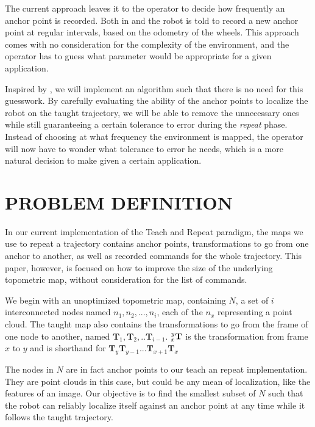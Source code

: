 \documentclass[letterpaper,10 pt,conference]{ieeeconf}
\newcommand{\mat}[1]{\mathbf{#1}}
\begin{document}
The current approach leaves it to the operator to decide how frequently an anchor point is
recorded. Both in \cite{Furgale10} and \cite{Sprunk13} the robot is told to record a new anchor
point at regular intervals, based on the odometry of the wheels. This approach comes with no
consideration for the complexity of the environment, and the operator has to guess what parameter
would be appropriate for a given application.

Inspired by \cite{Churchill15}, we will implement an algorithm such that there is no need for this
guesswork. By carefully evaluating the ability of the anchor points to localize the robot on the taught
trajectory, we will be able to remove the unnecessary ones while still guaranteeing a certain
tolerance to error during the \textit{repeat} phase. Instead of choosing at what frequency the
environment is mapped, the operator will now have to wonder what tolerance to error he needs, which
is a more natural decision to make given a certain application.


\section{PROBLEM DEFINITION}

In our current implementation of the Teach and Repeat paradigm, the maps we use to repeat a
trajectory contains anchor points, transformations to go from one anchor to another, as well as
recorded commands for the whole trajectory. This paper, however, is focused on how to improve the
size of the underlying topometric map, without consideration for the list of commands.

We begin with an unoptimized topometric map, containing $N$, a set of $i$
interconnected nodes named $n_1, n_2, ..., n_{i}$, each of the $n_x$ representing
a point cloud. The taught map also contains the transformations to go from the
frame of one node to another, named $\mat{T}_1, \mat{T}_2,..
\mat{T}_{i-1}$.
$\prescript{y}{x}{\mat{T}}$ is the transformation from frame $x$ to $y$ and is
shorthand for $\mat{T}_y \mat{T}_{y-1}...\mat{T}_{x+1} \mat{T}_x$ 

The nodes in $N$ are in fact anchor points to our teach an
repeat implementation. They are point clouds in this case, but could be any mean
of localization, like the features of an image. Our objective is to find the
smallest subset of $N$ such that the robot can reliably localize itself against
an anchor point at any time while it follows the taught trajectory.
\end{document}
